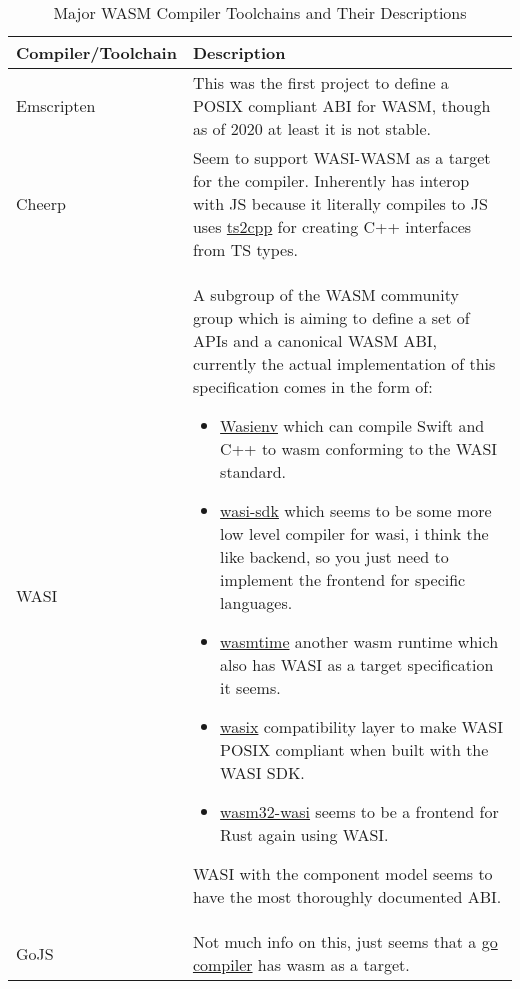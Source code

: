 \begin{table*}[ht!]
\centering
\begin{tabular}{|l|p{15cm}|}
\hline
\textbf{Compiler/Toolchain} & \textbf{Description} \\ \hline
Emscripten & This was the first project to define a POSIX compliant ABI for WASM, though as of 2020 at least it is not stable. \\ \hline
Cheerp & Seem to support WASI-WASM as a target for the compiler. Inherently has interop with JS because it literally compiles to JS uses \href{https://github.com/leaningtech/ts2cpp/}{ts2cpp} for creating C++ interfaces from TS types. \\ \hline
WASI & A subgroup of the WASM community group which is aiming to define a set of APIs and a canonical WASM ABI, currently the actual implementation of this specification comes in the form of:
\begin{itemize}
    \item \href{https://github.com/wasienv/wasienv}{Wasienv} which can compile Swift and C++ to wasm conforming to the WASI standard.
    \item \href{https://github.com/WebAssembly/wasi-sdk}{wasi-sdk} which seems to be some more low level compiler for wasi, i think the like backend, so you just need to implement the frontend for specific languages.
    \item \href{https://wasmtime.dev/}{wasmtime} another wasm runtime which also has WASI as a target specification it seems.
    \item \href{https://github.com/singlestore-labs/wasix}{wasix} compatibility layer to make WASI POSIX compliant when built with the WASI SDK.
    \item \href{https://github.com/bytecodealliance/cargo-wasi}{wasm32-wasi} seems to be a frontend for Rust again using WASI.
\end{itemize}
WASI with the component model seems to have the most thoroughly documented ABI. \\ \hline
GoJS & Not much info on this, just seems that a \href{https://tinygo.org/}{go compiler} has wasm as a target. \\ \hline
\end{tabular}
\caption{Major WASM Compiler Toolchains and Their Descriptions}
\label{table:wasm_compilers}
\end{table*}

